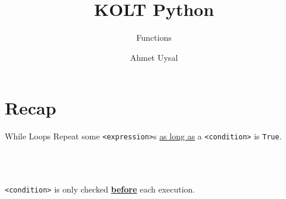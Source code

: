 
\usepackage{../KU-Beamer-Template/style/koc} 
\usepackage{minted}
\usepackage{upquote}
\usepackage{graphicx}


\title{KOLT Python}
\subtitle{Functions} 
\date{}
\author{Ahmet Uysal}


\makeatletter
\let\@@magyar@captionfix\relax
\makeatother

    \maketitle


    \section{Recap}
       \begin{frame}{While Loops}
            Repeat some \texttt{<expression>}s \underline{as long as} a \texttt{<condition>} is \texttt{True}.
            \begin{columns}
                \begin{column}{0.45\textwidth}
                    \inputminted[frame=single,framesep=2pt]{python3}{../Lecture3/code-examples/while1.py}
                \end{column}
                \begin{column}{0.45\textwidth}
                    \inputminted[frame=single,framesep=2pt]{python3}{../Lecture3/code-examples/while2.py}
                \end{column} 
            \end{columns}
            \LARGE
            \inputminted[frame=single,framesep=2pt]{python3}{../Lecture3/code-examples/while3.py}
            \texttt{<condition>} is only checked \textbf{\underline{before}} each execution.
        \end{frame}

